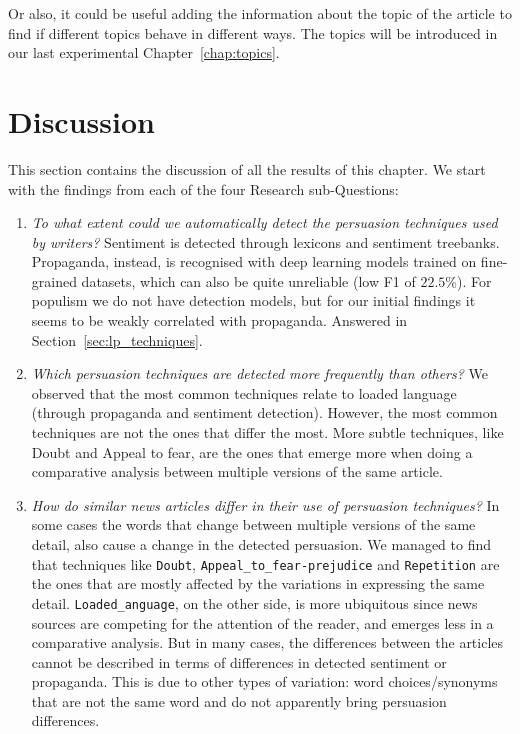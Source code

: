 Or also, it could be useful adding the information about the topic of the article to find if different topics behave in different ways. The topics will be introduced in our last experimental Chapter~\ref{chap:topics}.

\section{\statusgreen Discussion}

This section contains the discussion of all the results of this chapter. We start with the findings from each of the four Research sub-Questions:

\begin{enumerate}[label={\textbf{RQ2.\arabic*:}},leftmargin=2cm]
    \item \emph{To what extent could we automatically detect the persuasion techniques used by writers?} Sentiment is detected through lexicons and sentiment treebanks. Propaganda, instead, is recognised with deep learning models trained on fine-grained datasets, which can also be quite unreliable (low F1 of $22.5\%$). For populism we do not have detection models, but for our initial findings it seems to be weakly correlated with propaganda.
    Answered in Section~\ref{sec:lp_techniques}. %
    \item \emph{Which persuasion techniques are detected more frequently than others?} We observed that the most common techniques relate to loaded language (through propaganda and sentiment detection). However, the most common techniques are not the ones that differ the most. More subtle techniques, like Doubt and Appeal to fear, are the ones that emerge more when doing a comparative analysis between multiple versions of the same article.
    \item \emph{How do similar news articles differ in their use of persuasion techniques?} In some cases the words that change between multiple versions of the same detail, also cause a change in the detected persuasion. We managed to find that techniques like \texttt{Doubt}, \texttt{Appeal\_to\_fear-prejudice} and \texttt{Repetition} are the ones that are mostly affected by the variations in expressing the same detail.
    \texttt{Loaded\_anguage}, on the other side, is more ubiquitous since news sources are competing for the attention of the reader, and emerges less in a comparative analysis.
    But in many cases, the differences between the articles cannot be described in terms of differences in detected sentiment or propaganda. This is due to other types of variation: word choices/synonyms that are not the same word and do not apparently bring persuasion differences.

\end{enumerate}
